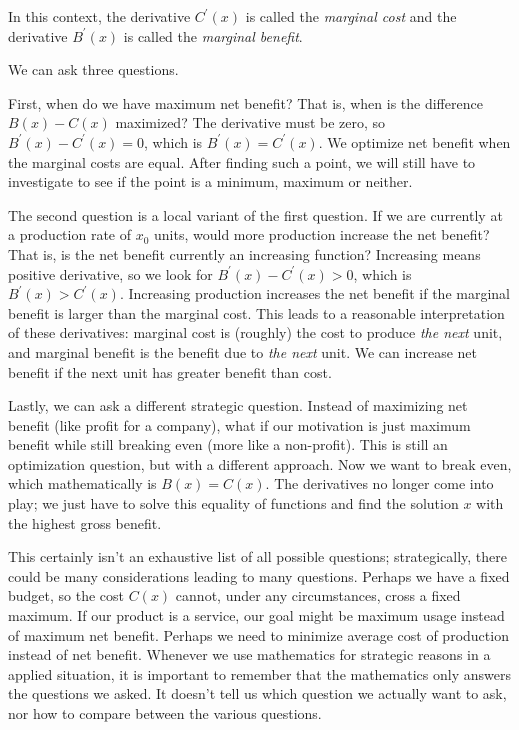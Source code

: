 \documentclass[fleqn]{report}
\begin{document}
In this context, the derivative $C^\prime(x)$ is called the
\emph{marginal cost} and the derivative $B^\prime(x)$ is
called the \emph{marginal benefit}. 

We can ask three questions.

\begin{smallitemize}
\item First, when do we have maximum net benefit? That is, when
is the difference $B(x) - C(x)$ maximized? The derivative must
be zero, so $B^\prime(x) - C^\prime(x) = 0$, which is
$B^\prime(x) = C^\prime(x)$. We optimize net benefit when the
marginal costs are equal. After finding such a point, we will
still have to investigate to see if the point is a minimum,
maximum or neither.
\item The second question is a local variant of the first
question. If we are currently at a production rate of $x_0$
units, would more production increase the net benefit? That
is, is the net benefit currently an increasing function?
Increasing means positive derivative, so we look for
$B^\prime(x) - C^\prime(x) > 0$, which is $B^\prime(x) >
C^\prime(x)$. Increasing production increases the net benefit
if the marginal benefit is larger than the marginal cost. This
leads to a reasonable interpretation of these derivatives:
marginal cost is (roughly) the cost to produce \emph{the next}
unit, and marginal benefit is the benefit due to \emph{the
next} unit. We can increase net benefit if the next unit has
greater benefit than cost. 
\item Lastly, we can ask a different strategic question.
Instead of maximizing net benefit (like profit for a company),
what if our motivation is just maximum benefit while still
breaking even (more like a non-profit). This is still an 
optimization question, but with a different approach. Now we
want to break even, which mathematically is $B(x) =
C(x)$. The derivatives no longer come into play; we just have
to solve this equality of functions and find the solution $x$
with the highest gross benefit.
\end{smallitemize}

This certainly isn't an exhaustive list of all possible questions;
strategically, there could be many considerations leading to
many questions. Perhaps we have a fixed budget, so the cost
$C(x)$ cannot, under any circumstances, cross a fixed maximum.
If our product is a service, our goal might be
maximum usage instead of maximum net benefit. Perhaps we need
to minimize average cost of production instead of net benefit.
Whenever we use mathematics for strategic reasons in a applied
situation, it is important to remember that the mathematics
only answers the questions we asked. It doesn't tell us
which question we actually want to ask, nor how to compare
between the various questions. 
\end{document}
